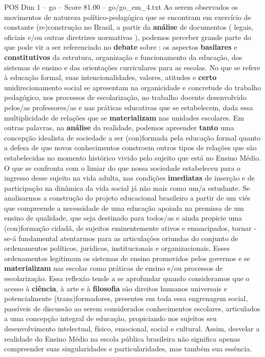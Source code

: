 \begin{textsample}{POS Dim 1 – go – Score 81.00 – go/go\_em\_4.txt}
Ao serem observados os movimentos de natureza político-pedagógica que se encontram em exercício de constante (re)construção no Brasil, a partir da \textbf{análise} de documentos ( legais, oficiais e/ou outras diretrizes normativas ), podemos perceber grande parte do que pode vir a ser referenciado no \textbf{debate} sobre : os aspectos \textbf{basilares} e \textbf{constitutivos} da estrutura, organização e funcionamento da educação, dos sistemas de ensino e das orientações curriculares para as escolas.
No que se refere à educação formal, suas intencionalidades, valores, atitudes e \textbf{certo} unidirecionamento social se apresentam na organicidade e concretude do trabalho pedagógico, nos processos de escolarização, no trabalho docente desenvolvido pelos/as professores/as e nas práticas educativas que se estabelecem, dada essa multiplicidade de relações que se \textbf{materializam} nas unidades escolares.
Em outras palavras, na \textbf{análise} da realidade, podemos apreender \textbf{tanto} uma concepção idealista de sociedade a ser (con)formada pela educação formal quanto a defesa de que novos conhecimentos constroem outros tipos de relações que são estabelecidas no momento histórico vivido pelo sujeito que está no Ensino Médio.
O que se confronta com o limiar do que nossa sociedade estabeleceu para o ingresso desse sujeito na vida adulta, nas condições \textbf{imediatas} de inserção e de participação na dinâmica da vida social já não mais como um/a estudante.
Se analisarmos a construção do projeto educacional brasileiro a partir de um viés que compreende a necessidade de uma educação apoiada na premissa de um ensino de qualidade, que seja destinado para todos/as e ainda propicie uma (con)formação cidadã, de sujeitos eminentemente ativos e emancipados, tornar -se-á fundamental atentarmos para as articulações oriundas do conjunto de ordenamentos políticos, jurídicos, institucionais e organizacionais.
Esses ordenamentos legitimam os sistemas de ensino promovidos pelos governos e se \textbf{materializam} nas escolas como práticas de ensino e/ou processos de escolarização.
Essa reflexão tende a se aprofundar quando consideramos que o acesso à \textbf{ciência}, à arte e à \textbf{filosofia} são direitos humanos universais e potencialmente (trans)formadores, presentes em toda essa engrenagem social, passíveis de discussão ao serem considerados conhecimentos escolares, articulados a uma concepção integral de educação, propiciando nos sujeitos seu desenvolvimento intelectual, físico, emocional, social e cultural.
Assim, desvelar a realidade do Ensino Médio na escola pública brasileira não significa apenas compreender suas singularidades e particularidades, mas também sua essência.

\end{textsample}
